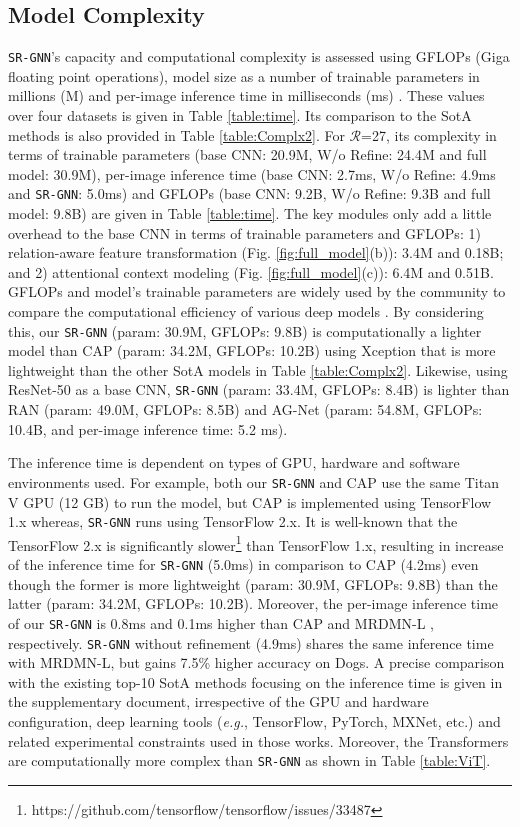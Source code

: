 \documentclass[journal]{IEEEtran}
\begin{document}
\vspace{ 0.3 cm}
\subsection {Model Complexity} 
\texttt{SR-GNN}'s capacity and computational complexity is assessed using  GFLOPs (Giga floating point operations), model size as a number of trainable parameters in millions (M) and per-image inference time in milliseconds (ms) \cite{tan2019efficientnet}. These values over four datasets is given in Table \ref{table:time}. Its comparison to the SotA methods is also provided in Table \ref{table:Complx2}. For $\mathcal{R}$=27, its complexity in terms of trainable parameters (base CNN: 20.9M, W/o Refine: 24.4M and full model: 30.9M), per-image inference time (base CNN: 2.7ms, W/o Refine: 4.9ms and \texttt{SR-GNN}: 5.0ms) and GFLOPs (base CNN: 9.2B, W/o Refine: 9.3B and full model: 9.8B) are given in Table \ref{table:time}. The key modules only add a little overhead to the base CNN in terms of trainable parameters and GFLOPs: 1) relation-aware feature transformation (Fig. \ref{fig:full_model}(b)): 3.4M and 0.18B; and 2) attentional context modeling (Fig. \ref{fig:full_model}(c)):  6.4M and 0.51B. GFLOPs and model’s trainable parameters are widely used by the community to compare the computational efficiency of various deep models \cite{tan2019efficientnet}. By considering this, our \texttt{SR-GNN} (param: 30.9M, GFLOPs: 9.8B) is computationally a lighter model than CAP (param: 34.2M, GFLOPs: 10.2B) using Xception that is more lightweight than the other SotA models in Table \ref{table:Complx2}. Likewise, using ResNet-50 as a base CNN,  \texttt{SR-GNN} (param: 33.4M, GFLOPs: 8.4B) is lighter than RAN (param: 49.0M, GFLOPs: 8.5B) and AG-Net (param: 54.8M, GFLOPs: 10.4B, and per-image inference time: 5.2 ms). 

 The inference time is dependent on types of GPU, hardware and software environments used. For example, both our \texttt{SR-GNN} and CAP \cite{behera2021context} use the same Titan V GPU (12 GB) to run the model, but CAP is implemented using TensorFlow 1.x whereas, \texttt{SR-GNN} runs using TensorFlow 2.x. It is well-known that the TensorFlow 2.x is significantly slower\footnote{https://github.com/tensorflow/tensorflow/issues/33487} than TensorFlow 1.x, resulting in increase of the inference time for \texttt{SR-GNN} (5.0ms) in comparison to CAP (4.2ms) even though the former is more lightweight (param: 30.9M, GFLOPs: 9.8B) than the latter (param: 34.2M, GFLOPs: 10.2B). Moreover, the per-image inference time of our \texttt{SR-GNN} is 0.8ms and 0.1ms higher than CAP and MRDMN-L \cite{xu2021multiresolution}, respectively. \texttt{SR-GNN} without refinement (4.9ms) shares the same inference time with MRDMN-L, but gains 7.5\%  higher accuracy on Dogs. A precise comparison with the existing top-10 SotA methods focusing on the inference time is given in the supplementary document, irrespective of the GPU and hardware configuration, deep learning tools (\textit{e.g.}, TensorFlow, PyTorch, MXNet, etc.) and related experimental constraints used in those works. Moreover, the Transformers are computationally more complex than \texttt{SR-GNN} as shown in Table \ref{table:ViT}.
\end{document}
